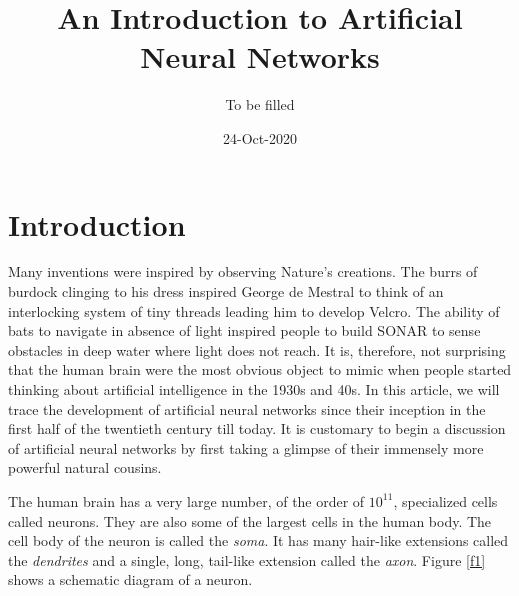 \documentclass[11pt]{article}
\title{An Introduction to Artificial Neural Networks}
\author{To be filled}
\date{24-Oct-2020}
\numberwithin{equation}{section}
\begin{document}
\maketitle
\section{Introduction}\label{s1}
Many inventions were inspired by observing Nature's creations. The burrs of
burdock clinging to his dress inspired George de Mestral to think of an
interlocking system of tiny threads leading him to develop Velcro. The ability
of bats to navigate in absence of light inspired people to build SONAR to
sense obstacles in deep water where light does not reach. It is, therefore,
not surprising that the human brain were the most obvious object to mimic
when people started thinking about artificial intelligence in the 1930s and 40s.
In this article, we will trace the development of artificial neural networks
since their inception in the first half of the twentieth century till today.
It is customary to begin a discussion of artificial neural networks by first
taking a glimpse of their immensely more powerful natural cousins.

The human brain has a very large number, of the order of $10^{11}$, specialized
cells called neurons. They are also some of the largest cells in the human
body. The cell body of the neuron is called the \emph{soma}. It has many 
hair-like extensions called the \emph{dendrites} and a single, long, tail-like
extension called the \emph{axon}. Figure \ref{f1} shows a schematic diagram of
a neuron.
\end{document}
